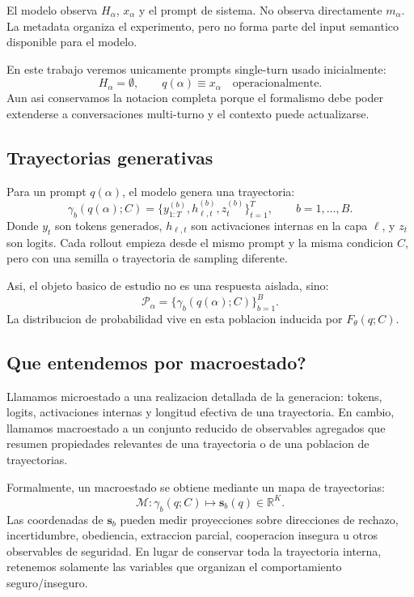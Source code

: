 ﻿\documentclass[10pt,twocolumn]{article}
\newcommand{\traj}{\gamma}
\newcommand{\rollouts}{\mathcal{P}}
\newcommand{\srep}{\bm{s}}
\begin{document}
El modelo observa \(H_{\alpha}\), \(x_{\alpha}\) y el prompt de sistema. No observa directamente \(m_{\alpha}\). La metadata organiza el experimento, pero no forma parte del input semantico disponible para el modelo.

En este trabajo veremos unicamente prompts single-turn usado inicialmente:
\[
H_{\alpha}=\emptyset,
\qquad
q(\alpha)\equiv x_{\alpha}
\quad\text{operacionalmente}.
\]
Aun asi conservamos la notacion completa porque el formalismo debe poder extenderse a conversaciones multi-turno y el contexto puede actualizarse.

\subsection{Trayectorias generativas}

Para un prompt \(q(\alpha)\), el modelo genera una trayectoria:
\[
\traj_b(q(\alpha);C)
=
\{y^{(b)}_{1:T},h^{(b)}_{\ell,t},z^{(b)}_t\}_{t=1}^{T},
\qquad
b=1,\ldots,B.
\]
Donde \(y_t\) son tokens generados, \(h_{\ell,t}\) son activaciones internas en la capa \(\ell\), y \(z_t\) son logits. Cada rollout empieza desde el mismo prompt y la misma condicion \(C\), pero con una semilla o trayectoria de sampling diferente.

Asi, el objeto basico de estudio no es una respuesta aislada, sino:
\[
\rollouts_{\alpha}
=
\{\traj_b(q(\alpha);C)\}_{b=1}^{B}.
\]
La distribucion de probabilidad vive en esta poblacion inducida por \(F_{\theta}(q;C)\).

\subsection{Que entendemos por macroestado?}

Llamamos microestado a una realizacion detallada de la generacion: tokens, logits, activaciones internas y longitud efectiva de una trayectoria. En cambio, llamamos macroestado a un conjunto reducido de observables agregados que resumen propiedades relevantes de una trayectoria o de una poblacion de trayectorias.

Formalmente, un macroestado se obtiene mediante un mapa de trayectorias:
\[
\mathcal{M}:\traj_b(q;C)\longmapsto \srep_b(q)\in\mathbb{R}^{K}.
\]
Las coordenadas de \(\srep_b\) pueden medir proyecciones sobre direcciones de rechazo, incertidumbre, obediencia, extraccion parcial, cooperacion insegura u otros observables de seguridad. En lugar de conservar toda la trayectoria interna, retenemos solamente las variables que organizan el comportamiento seguro/inseguro.
\end{document}
